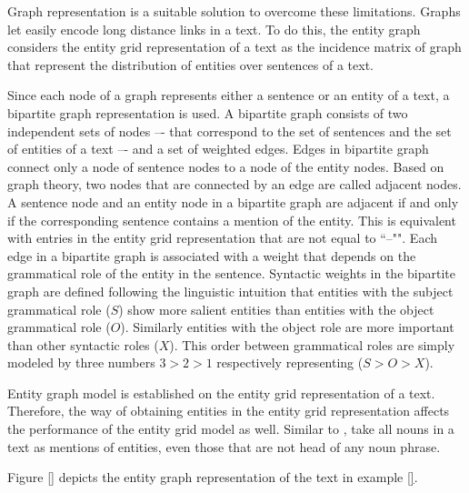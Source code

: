 Graph representation is a suitable solution to overcome these limitations. 
Graphs let easily encode long distance links in a text. 
To do this, the entity graph considers the entity grid representation of a text as the incidence matrix of graph that represent the distribution of entities over sentences of a text. 

Since each node of a graph represents either a sentence or an entity of a text, a bipartite graph representation is used. 
A bipartite graph consists of two independent sets of nodes –- that correspond to the set of sentences and the set of
entities of a text –- and a set of weighted edges. 
Edges in bipartite graph connect only a node of sentence nodes to a node of the entity nodes.  
Based on graph theory, two nodes that are connected by an edge are called adjacent nodes. 
A sentence node and an entity node in a bipartite graph are adjacent if and only if the corresponding sentence contains a mention of the entity.  
This is equivalent with entries in the entity grid representation that are not equal to ``--"". 
Each edge in a bipartite graph is associated with a weight that depends on the grammatical role of the  entity in the sentence. 
Syntactic weights in the bipartite graph are defined following the linguistic intuition that entities with the subject grammatical role ($S$) show more salient entities than entities with the object grammatical role ($O$).
Similarly entities with the object role are more important than other syntactic roles ($X$).  
This order between grammatical roles are simply modeled by three numbers $3>2>1$ respectively representing ($S>O>X$). 

Entity graph model is established on the entity grid representation of a text. 
Therefore, the way of obtaining entities in the entity grid representation affects the performance of the entity grid model as well.  
Similar to ,  take all nouns in a text as mentions of entities, even those that are not head of any noun phrase. 

Figure \ref{} depicts the entity graph representation of the text in example \ref{}.

